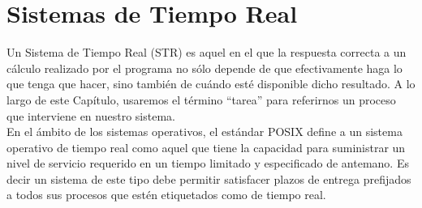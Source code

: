\chapter{Sistemas de Tiempo Real}

Un Sistema de Tiempo Real (STR) es aquel en el que la respuesta correcta a un cálculo realizado por el programa no sólo depende de que efectivamente haga lo que tenga que hacer, sino también de cuándo esté disponible dicho resultado. A lo largo de este Capítulo, usaremos el término ``tarea'' para referirnos un proceso que interviene en nuestro sistema.\\

En el ámbito de los sistemas operativos, el estándar POSIX define a un sistema operativo de tiempo real como aquel que tiene la capacidad para suministrar un nivel de servicio requerido en un tiempo limitado y especificado de antemano. Es decir un sistema de este tipo debe permitir satisfacer plazos de entrega prefijados a todos sus procesos que estén etiquetados como de tiempo real.

